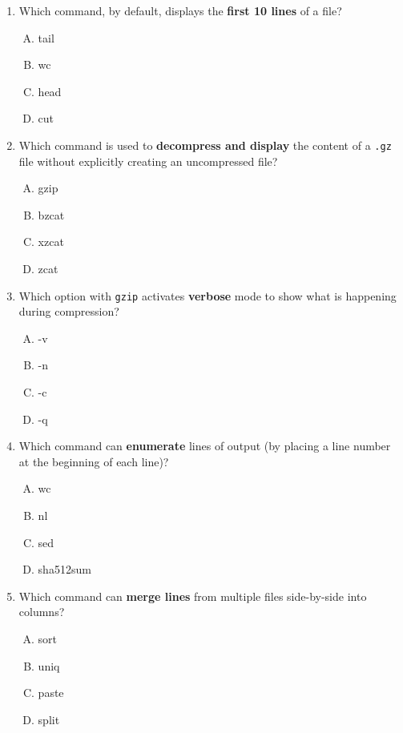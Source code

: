 \documentclass[a4paper]{report}
\begin{document}
\begin{enumerate}[1.]
    \item Which command, by default, displays the \textbf{first 10 lines} of a file?  
    \begin{enumerate}[A)]
        \item tail  
        \item wc  
        \item head  
        \item cut  
    \end{enumerate}

    \item Which command is used to \textbf{decompress and display} the content of a \texttt{.gz} file without explicitly creating an uncompressed file?  
    \begin{enumerate}[A)]
        \item gzip  
        \item bzcat  
        \item xzcat  
        \item zcat  
    \end{enumerate}

    \item Which option with \texttt{gzip} activates \textbf{verbose} mode to show what is happening during compression?  
    \begin{enumerate}[A)]
        \item -v  
        \item -n  
        \item -c  
        \item -q  
    \end{enumerate}

    \item Which command can \textbf{enumerate} lines of output (by placing a line number at the beginning of each line)?  
    \begin{enumerate}[A)]
        \item wc  
        \item nl  
        \item sed  
        \item sha512sum  
    \end{enumerate}

    \item Which command can \textbf{merge lines} from multiple files side-by-side into columns?  
    \begin{enumerate}[A)]
        \item sort  
        \item uniq  
        \item paste  
        \item split  
    \end{enumerate}


\end{enumerate}
\end{document}
